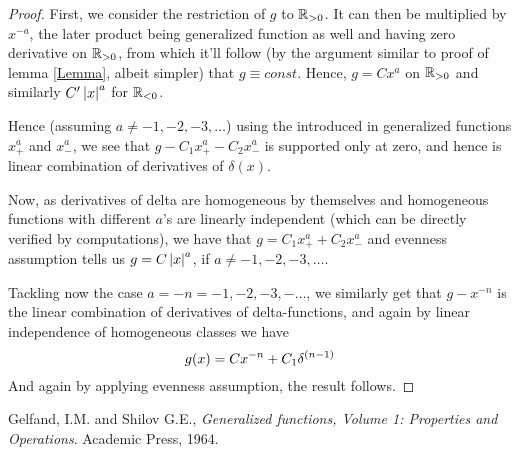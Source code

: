 \documentclass[10pt]{article} %
\begin{document}
\begin{proof}
		First, we consider the restriction of $g$ to $\mathbb{R}_{>0}$. It can then be multiplied by $x^{-a}$, the later
		product being generalized function as well and having zero derivative on $\mathbb{R}_{>0}$, from which it'll follow
		(by the argument similar to proof of lemma \ref{Lemma}, albeit simpler)
		that $g\equiv const$. Hence, $g=Cx^a$ on $\mathbb{R}_{>0}$ and similarly $C'\left|x\right|^a$ for $\mathbb{R}_{<0}$.
		
		Hence (assuming $a\neq-1,-2,-3,\hdots$)
		using the introduced in \cite{gelfand} generalized functions $x^a_+$ and $x_-^a$, we
		see that $g-C_1x_+^a-C_2x_-^a$ is supported only at zero, and hence is linear combination of derivatives
		of $\delta(x)$.

		Now, as derivatives of delta are homogeneous by themselves and homogeneous functions with different $a$'s
		 are linearly independent
		(which can be directly verified by computations), we have that $g=C_1x_+^a+C_2x^a_-$ and evenness assumption
		tells us $g=C\left|x\right|^a$, if $a\neq-1,-2,-3,\hdots$.

		Tackling now the case $a=-n=-1,-2,-3,-\hdots$, we similarly get that $g-x^{-n}$ is the linear combination of
		derivatives of delta-functions, and again by linear independence of homogeneous classes we have
		\[g(x)=Cx^{-n}+C_1\delta^{\left(n-1\right)}\]
		And again by applying evenness assumption, the result follows.
	\end{proof}
\begin{thebibliography}{9}
Gelfand, I.M. and Shilov G.E., {\em Generalized functions, Volume 1:
 Properties and Operations}. Academic Press, 1964.
\end{thebibliography}
\end{document}
